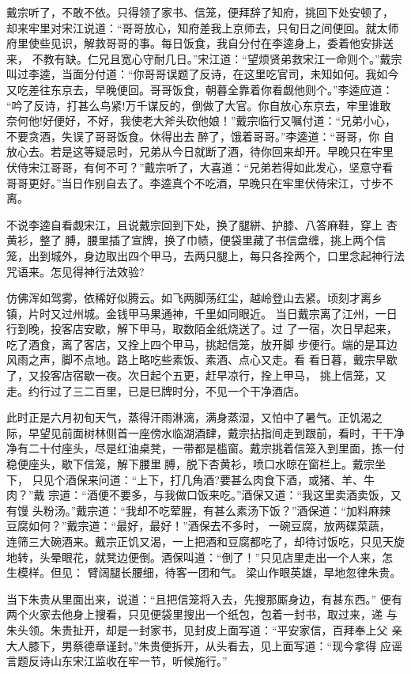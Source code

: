 戴宗听了，不敢不依。只得领了家书、信笼，便拜辞了知府，挑回下处安顿了，
却来牢里对宋江说道：“哥哥放心，知府差我上京师去，只旬日之间便回。就太师
府里使些见识，解救哥哥的事。每日饭食，我自分付在李逵身上，委着他安排送来，
不教有缺。仁兄且宽心守耐几日。”宋江道：“望烦贤弟救宋江一命则个。”戴宗
叫过李逵，当面分付道：“你哥哥误题了反诗，在这里吃官司，未知如何。我如今
又吃差往东京去，早晚便回。哥哥饭食，朝暮全靠着你看觑他则个。”李逵应道：
“吟了反诗，打甚么鸟紧!万千谋反的，倒做了大官。你自放心东京去，牢里谁敢
奈何他!好便好，不好，我使老大斧头砍他娘！”戴宗临行又嘱付道：“兄弟小心，
不要贪酒，失误了哥哥饭食。休得出去醉了，饿着哥哥。”李逵道：“哥哥，你
自放心去。若是这等疑忌时，兄弟从今日就断了酒，待你回来却开。早晚只在牢里
伏侍宋江哥哥，有何不可？”戴宗听了，大喜道：“兄弟若得如此发心，坚意守看
哥哥更好。”当日作别自去了。李逵真个不吃酒，早晚只在牢里伏侍宋江，寸步不
离。

不说李逵自看觑宋江，且说戴宗回到下处，换了腿絣、护膝、八答麻鞋，穿上
杏黄衫，整了膊，腰里插了宣牌，换了巾帻，便袋里藏了书信盘缠，挑上两个信
笼，出到城外，身边取出四个甲马，去两只腿上，每只各拴两个，口里念起神行法
咒语来。怎见得神行法效验?

仿佛浑如驾雾，依稀好似腾云。如飞两脚荡红尘，越岭登山去紧。顷刻才离乡
镇，片时又过州城。金钱甲马果通神，千里如同眼近。
当日戴宗离了江州，一日行到晚，投客店安歇，解下甲马，取数陌金纸烧送了。过
了一宿，次日早起来，吃了酒食，离了客店，又拴上四个甲马，挑起信笼，放开脚
步便行。端的是耳边风雨之声，脚不点地。路上略吃些素饭、素酒、点心又走。看
看日暮，戴宗早歇了，又投客店宿歇一夜。次日起个五更，赶早凉行，拴上甲马，
挑上信笼，又走。约行过了三二百里，已是巳牌时分，不见一个干净酒店。

此时正是六月初旬天气，蒸得汗雨淋漓，满身蒸湿，又怕中了暑气。正饥渴之
际，早望见前面树林侧首一座傍水临湖酒肆，戴宗拈指间走到跟前，看时，干干净
净有二十付座头，尽是红油桌凳，一带都是槛窗。戴宗挑着信笼入到里面，拣一付
稳便座头，歇下信笼，解下腰里膊，脱下杏黄衫，喷口水晾在窗栏上。戴宗坐下，
只见个酒保来问道：“上下，打几角酒?要甚么肉食下酒，或猪、羊、牛肉？”戴
宗道：“酒便不要多，与我做口饭来吃。”酒保又道：“我这里卖酒卖饭，又有馒
头粉汤。”戴宗道：“我却不吃荤腥，有甚么素汤下饭？”酒保道：“加料麻辣
豆腐如何？”戴宗道：“最好，最好！”酒保去不多时，一碗豆腐，放两碟菜蔬，
连筛三大碗酒来。戴宗正饥又渴，一上把酒和豆腐都吃了，却待讨饭吃，只见天旋
地转，头晕眼花，就凳边便倒。酒保叫道：“倒了！”只见店里走出一个人来，怎
生模样。但见：
臂阔腿长腰细，待客一团和气。
梁山作眼英雄，旱地忽律朱贵。

当下朱贵从里面出来，说道：“且把信笼将入去，先搜那厮身边，有甚东西。”
便有两个火家去他身上搜看，只见便袋里搜出一个纸包，包着一封书，取过来，递
与朱头领。朱贵扯开，却是一封家书，见封皮上面写道：“平安家信，百拜奉上父
亲大人膝下，男蔡德章谨封。”朱贵便拆开，从头看去，见上面写道：“现今拿得
应谣言题反诗山东宋江监收在牢一节，听候施行。”

